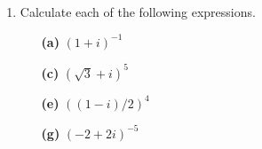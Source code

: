 {\begin{enumerate}
\begin{minipage}[t]{4.6in}
\begin{minipage}[t]{2.25in}
\begin{itemize}
 \item[{\bf (a)}]
$1-i$
 
 \item[{\bf (c)}]
$2+2i$
 
 \item[{\bf (e)}]
$-3i$
 
\end{itemize}
\end{minipage} \hfill
\begin{minipage}[t]{2.25in}
\begin{itemize}
 
 \item[{\bf (b)}]
$-5$
 
 \item[{\bf (d)}]
$\sqrt{3} + i$
 
 \item[{\bf (f)}]
$2i + 2 \sqrt{3}$
 
\end{itemize}
\end{minipage}
\end{minipage}
 
\vspace{2pt}        %
 
 
\bf\item\rm %
Calculate each of the following expressions.
 
 
\vspace{3pt}        %
 
\hspace{-7pt}
\begin{minipage}[t]{4.6in}
\noindent
\begin{minipage}[t]{2.25in}
\begin{itemize}
 
 \item[{\bf (a)}]
$(1+i)^{-1}$
 
 \item[{\bf (c)}]
$(\sqrt{3}+i)^{5}$
 
 \item[{\bf (e)}]
$((1-i)/2)^{4}$
 
 \item[{\bf (g)}]
$(-2+2i)^{-5}$
 
\end{itemize}
\end{minipage} \hfill
\begin{minipage}[t]{2.25in}
\begin{itemize}
 

\end{itemize}
\end{minipage}
\end{minipage}
\end{enumerate}}
